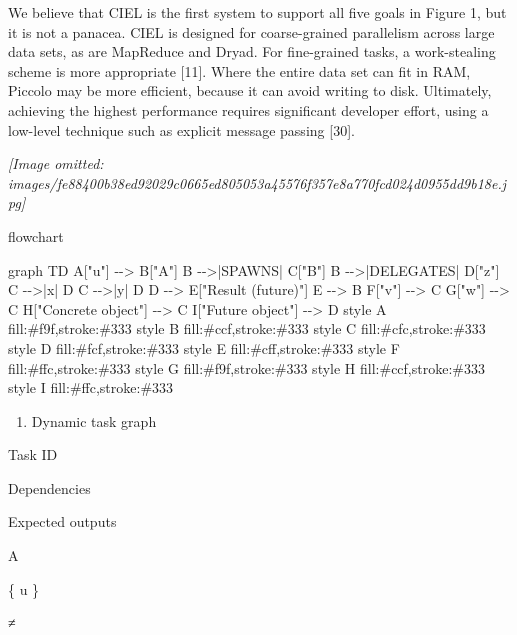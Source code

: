 \documentclass[
]{article}
\newenvironment{Shaded}{}{}
\newcommand{\NormalTok}[1]{#1}
\providecommand{\tightlist}{%
  \setlength{\itemsep}{0pt}\setlength{\parskip}{0pt}}
\begin{document}
We believe that CIEL is the first system to support all five goals in
Figure 1, but it is not a panacea. CIEL is designed for coarse-grained
parallelism across large data sets, as are MapReduce and Dryad. For
fine-grained tasks, a work-stealing scheme is more appropriate {[}11{]}.
Where the entire data set can fit in RAM, Piccolo may be more efficient,
because it can avoid writing to disk. Ultimately, achieving the highest
performance requires significant developer effort, using a low-level
technique such as explicit message passing {[}30{]}.

\textit{[Image omitted: images/fe88400b38ed92029c0665ed805053a45576f357e8a770fcd024d0955dd9b18e.jpg]}

flowchart

\begin{Shaded}
\begin{Highlighting}[]
\NormalTok{graph TD}
\NormalTok{    A["u"] {-}{-}\textgreater{} B["A"]}
\NormalTok{    B {-}{-}\textgreater{}|SPAWNS| C["B"]}
\NormalTok{    B {-}{-}\textgreater{}|DELEGATES| D["z"]}
\NormalTok{    C {-}{-}\textgreater{}|x| D}
\NormalTok{    C {-}{-}\textgreater{}|y| D}
\NormalTok{    D {-}{-}\textgreater{} E["Result (future)"]}
\NormalTok{    E {-}{-}\textgreater{} B}
\NormalTok{    F["v"] {-}{-}\textgreater{} C}
\NormalTok{    G["w"] {-}{-}\textgreater{} C}
\NormalTok{    H["Concrete object"] {-}{-}\textgreater{} C}
\NormalTok{    I["Future object"] {-}{-}\textgreater{} D}
\NormalTok{    style A fill:\#f9f,stroke:\#333}
\NormalTok{    style B fill:\#ccf,stroke:\#333}
\NormalTok{    style C fill:\#cfc,stroke:\#333}
\NormalTok{    style D fill:\#fcf,stroke:\#333}
\NormalTok{    style E fill:\#cff,stroke:\#333}
\NormalTok{    style F fill:\#ffc,stroke:\#333}
\NormalTok{    style G fill:\#f9f,stroke:\#333}
\NormalTok{    style H fill:\#ccf,stroke:\#333}
\NormalTok{    style I fill:\#ffc,stroke:\#333}
\end{Highlighting}
\end{Shaded}

\begin{enumerate}
\def\labelenumi{(\alph{enumi})}
\tightlist
\item
  Dynamic task graph
\end{enumerate}

Task ID

Dependencies

Expected outputs

A

\{ u \}

≠
\end{document}
